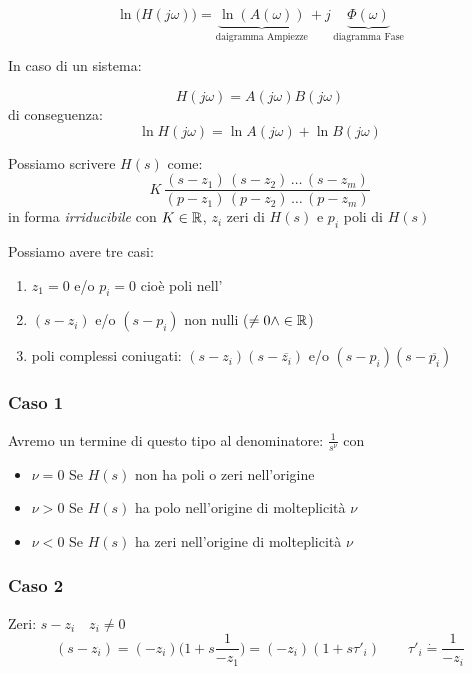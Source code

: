 \[ 
	\ln \big(H(j\omega)\big) = \underbrace{\ln (A(\omega))}_{\text{daigramma Ampiezze}} + j\,\underbrace{\Phi (\omega)}_{\text{diagramma Fase}}
 \]
 
 In caso di un sistema:
\begin{center}
	
\end{center}

\[ 
	H(j \omega)=A(j \omega)B(j \omega)
 \]
 di conseguenza: 
 \[ 
	\ln H(j \omega)=\ln A(j \omega) + \ln B(j \omega)
 \]
 
 
 
 Possiamo scrivere $ H(s) $ come:
 \[  
 	K \, \frac{(s-z_1)\,(s-z_2)\,\dots \,(s-z_m)}{(p-z_1)\,(p-z_2)\,\dots \,(p-z_m)}
 \]
 in forma \emph{irriducibile} con $K \in \mathbb{R}  $, $ z_i $ zeri di $ H(s) $ e $ p_i $ poli di $ H(s) $
 
 Possiamo avere tre casi:
 \begin{enumerate}
 	\item $ z_1=0 $ e/o $ p_i = 0 $ cioè poli nell' 
 	\item $ (s-z_i) $ e/o $ (s-p_i) $ non nulli ($ \ne 0  \wedge \in \mathbb{R}$)
 	\item poli complessi coniugati: $ (s-z_i)(s-\overline{z_i}) $ e/o  $ (s-p_i)(s-\overline{p_i}) $
 \end{enumerate}

\subsubsection{Caso 1}
Avremo un termine di questo tipo al denominatore:
 $ \frac{1}{s^\nu}  $
con 
\begin{itemize}
	\item $ \nu =0 $ Se $ H(s) $ non ha poli o zeri nell'origine
	\item $ \nu >0 $ Se $ H(s) $ ha polo nell'origine di molteplicità $ \nu $
	\item $ \nu <0 $ Se $ H(s) $ ha zeri nell'origine di molteplicità $\nu$
\end{itemize}

\subsubsection{Caso 2}
Zeri: $ s-z_i \quad z_i \ne 0 $
\[ 
	(s-z_i)=(-z_i)\Big(1+s \frac{1}{-z_1} \Big)=(-z_i)(1+s \tau'_i) \qquad \tau'_i \dot{=} \frac{1}{-z_i}
 \]
 
